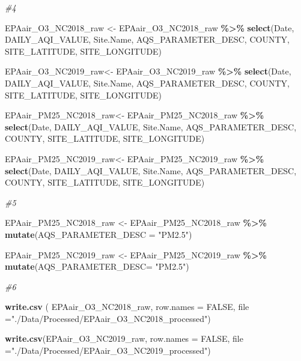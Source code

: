 \documentclass[
]{article}
\newenvironment{Shaded}{\begin{snugshade}}{\end{snugshade}}
\newcommand{\AttributeTok}[1]{\textcolor[rgb]{0.13,0.29,0.53}{#1}}
\newcommand{\CommentTok}[1]{\textcolor[rgb]{0.56,0.35,0.01}{\textit{#1}}}
\newcommand{\ConstantTok}[1]{\textcolor[rgb]{0.56,0.35,0.01}{#1}}
\newcommand{\FunctionTok}[1]{\textcolor[rgb]{0.13,0.29,0.53}{\textbf{#1}}}
\newcommand{\NormalTok}[1]{#1}
\newcommand{\OtherTok}[1]{\textcolor[rgb]{0.56,0.35,0.01}{#1}}
\newcommand{\SpecialCharTok}[1]{\textcolor[rgb]{0.81,0.36,0.00}{\textbf{#1}}}
\newcommand{\StringTok}[1]{\textcolor[rgb]{0.31,0.60,0.02}{#1}}
\begin{document}
\begin{Shaded}
\begin{Highlighting}[]
\CommentTok{\#4}

\NormalTok{EPAair\_O3\_NC2018\_raw }\OtherTok{\textless{}{-}}\NormalTok{ EPAair\_O3\_NC2018\_raw }\SpecialCharTok{\%\textgreater{}\%}
  \FunctionTok{select}\NormalTok{(Date, DAILY\_AQI\_VALUE, Site.Name,}
\NormalTok{          AQS\_PARAMETER\_DESC, COUNTY,}
\NormalTok{          SITE\_LATITUDE, SITE\_LONGITUDE)}
  
\NormalTok{EPAair\_O3\_NC2019\_raw}\OtherTok{\textless{}{-}}\NormalTok{ EPAair\_O3\_NC2019\_raw }\SpecialCharTok{\%\textgreater{}\%}
  \FunctionTok{select}\NormalTok{(Date, DAILY\_AQI\_VALUE, Site.Name,}
\NormalTok{          AQS\_PARAMETER\_DESC, COUNTY,}
\NormalTok{          SITE\_LATITUDE, SITE\_LONGITUDE)}

\NormalTok{EPAair\_PM25\_NC2018\_raw}\OtherTok{\textless{}{-}}\NormalTok{ EPAair\_PM25\_NC2018\_raw }\SpecialCharTok{\%\textgreater{}\%}
  \FunctionTok{select}\NormalTok{(Date, DAILY\_AQI\_VALUE, Site.Name,}
\NormalTok{          AQS\_PARAMETER\_DESC, COUNTY,}
\NormalTok{          SITE\_LATITUDE, SITE\_LONGITUDE)}

\NormalTok{EPAair\_PM25\_NC2019\_raw}\OtherTok{\textless{}{-}}\NormalTok{ EPAair\_PM25\_NC2019\_raw }\SpecialCharTok{\%\textgreater{}\%}
  \FunctionTok{select}\NormalTok{(Date, DAILY\_AQI\_VALUE, Site.Name,}
\NormalTok{          AQS\_PARAMETER\_DESC, COUNTY,}
\NormalTok{          SITE\_LATITUDE, SITE\_LONGITUDE)}


\CommentTok{\#5}

\NormalTok{EPAair\_PM25\_NC2018\_raw }\OtherTok{\textless{}{-}}\NormalTok{ EPAair\_PM25\_NC2018\_raw }\SpecialCharTok{\%\textgreater{}\%}
  \FunctionTok{mutate}\NormalTok{(}\AttributeTok{AQS\_PARAMETER\_DESC =} \StringTok{"PM2.5"}\NormalTok{)}

\NormalTok{EPAair\_PM25\_NC2019\_raw  }\OtherTok{\textless{}{-}}\NormalTok{ EPAair\_PM25\_NC2019\_raw }\SpecialCharTok{\%\textgreater{}\%}
  \FunctionTok{mutate}\NormalTok{(}\AttributeTok{AQS\_PARAMETER\_DESC=} \StringTok{"PM2.5"}\NormalTok{)}

\CommentTok{\#6}

\FunctionTok{write.csv}\NormalTok{ ( EPAair\_O3\_NC2018\_raw, }\AttributeTok{row.names =} \ConstantTok{FALSE}\NormalTok{, }
          \AttributeTok{file =}\StringTok{"./Data/Processed/EPAair\_O3\_NC2018\_processed"}\NormalTok{)}


\FunctionTok{write.csv}\NormalTok{(EPAair\_O3\_NC2019\_raw, }\AttributeTok{row.names =} \ConstantTok{FALSE}\NormalTok{, }
          \AttributeTok{file =}\StringTok{"./Data/Processed/EPAair\_O3\_NC2019\_processed"}\NormalTok{)}



\end{Highlighting}
\end{Shaded}
\end{document}
